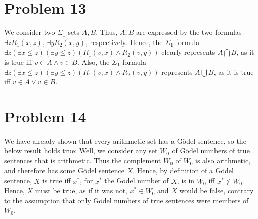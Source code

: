 \documentclass{article}
\theoremstyle{definition}
\begin{document}
\section*{Problem 13}
We consider two $\Sigma_1$ sets $A, B$. Thus, $A, B$ are expressed by the two formulas $\exists zR_1(x,z)$, $\exists yR_2(x,y)$, respectively. Hence, 
the $\Sigma_1$ formula $\exists z(\exists x\le z)(\exists y\le z)(R_1(v,x)\wedge R_2(v,y))$ clearly represents $A\bigcap B$, as it is true iff $v\in A
\wedge v\in B$. Also, the $\Sigma_1$ formula $\exists z(\exists x\le z)(\exists y\le z)(R_1(v,x)\wedge R_2(v,y))$ represents $A\bigcup B$, as it is true iff 
$v\in A\vee v\in B$.
\section*{Problem 14}
We have already shown that every arithmetic set has a Gödel sentence, so the below result holds true:\newline 
Well, we consider any set $W_0$ of Gödel numbers of true sentences that is arithmetic. Thus the complement $\widetilde W_0$ of $W_0$ is also arithmetic, 
and therefore has some Gödel sentence $X$. Hence, by definition of a Gödel sentence, $X$ is true iff $x^*$, for $x^*$ the Gödel number of 
$X$, is in $\widetilde W_0$ iff $x^*\notin W_0$. Hence, $X$ must be true, as if it was not, $x^*\in W_0$ and $X$ would be false, contrary to the assumption
 that only Gödel numbers of true sentences were members of $W_0$.
\end{document}
